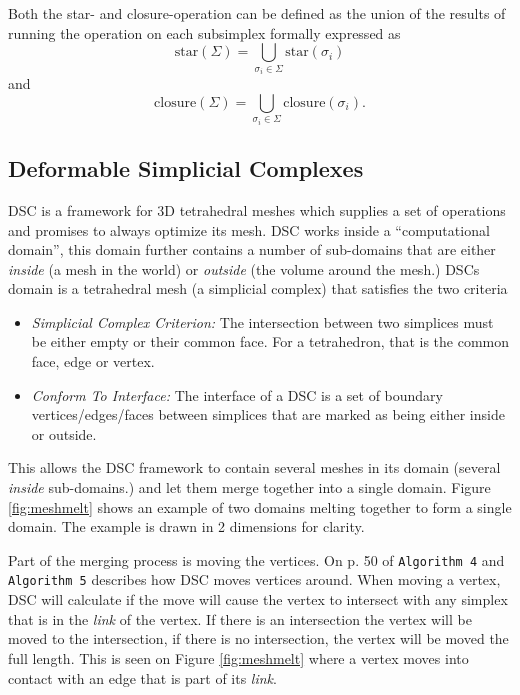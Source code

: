 Both the star- and closure-operation can be defined as the union of the results
of running the operation on each subsimplex formally expressed as
\[
  \text{star}(\Sigma) = \bigcup_{\sigma_i \in \Sigma} \text{star}(\sigma_i)
\]
and
\[
  \text{closure}(\Sigma) = \bigcup_{\sigma_i \in \Sigma} \text{closure}(\sigma_i).
\]


\subsection{Deformable Simplicial Complexes}
DSC is a framework for 3D tetrahedral meshes which supplies a set of operations
and promises to always optimize its mesh. DSC works inside a ``computational
domain'', this domain further contains a number of sub-domains that are either
\textit{inside} (a mesh in the world) or \textit{outside} (the volume around the
mesh.) DSCs domain is a tetrahedral mesh (a simplicial complex) that satisfies
the two criteria
\begin{itemize}
  \item \textit{Simplicial Complex Criterion:} The intersection between two
        simplices must be either empty or their common face. For a tetrahedron,
        that is the common face, edge or vertex.
  \item \textit{Conform To Interface:} The interface of a DSC is a set of
        boundary vertices/edges/faces between simplices that are marked as being
        either inside or outside.
\end{itemize}

This allows the DSC framework to contain several meshes in its domain (several
\textit{inside} sub-domains.) and let them merge together into a single domain.
Figure \ref{fig:meshmelt} shows an example of two domains melting together to
form a single domain. The example is drawn in 2 dimensions for clarity.


Part of the merging process is moving the vertices. On p. 50 of \cite{DSC10}
\texttt{Algorithm 4} and \texttt{Algorithm 5} describes how DSC moves vertices
around. When moving a vertex, DSC will calculate if the move will cause the
vertex to intersect with any simplex that is in the \textit{link} of the vertex.
If there is an intersection the vertex will be moved to the intersection, if
there is no intersection, the vertex will be moved the full length. This is
seen on Figure \ref{fig:meshmelt} where a vertex moves into contact with an
edge that is part of its \textit{link}.

